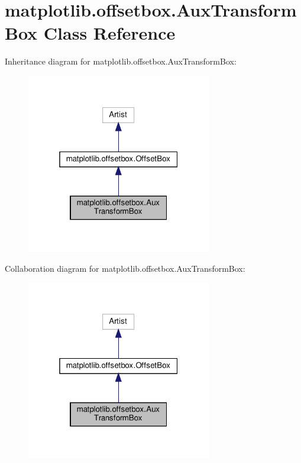 \hypertarget{classmatplotlib_1_1offsetbox_1_1AuxTransformBox}{}\section{matplotlib.\+offsetbox.\+Aux\+Transform\+Box Class Reference}
\label{classmatplotlib_1_1offsetbox_1_1AuxTransformBox}


Inheritance diagram for matplotlib.\+offsetbox.\+Aux\+Transform\+Box\+:
\nopagebreak
\begin{figure}[H]
\begin{center}
\leavevmode
\includegraphics[width=229pt]{classmatplotlib_1_1offsetbox_1_1AuxTransformBox__inherit__graph}
\end{center}
\end{figure}


Collaboration diagram for matplotlib.\+offsetbox.\+Aux\+Transform\+Box\+:
\nopagebreak
\begin{figure}[H]
\begin{center}
\leavevmode
\includegraphics[width=229pt]{classmatplotlib_1_1offsetbox_1_1AuxTransformBox__coll__graph}
\end{center}
\end{figure}
